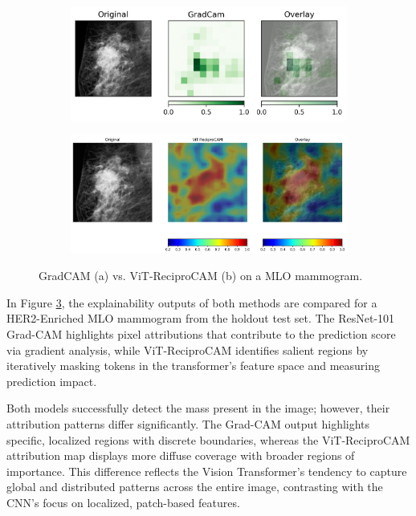 \documentclass[a4paper,10pt]{book}
\begin{document}
\begin{figure}[h!]
    \centering
    \begin{subfigure}[c]{0.48\textwidth}
        \centering
        \includegraphics[width=\textwidth]{reports//assets/D2-0138_MLO-R_Resnet.png}
        \caption{}
        \label{fig:mlo_grad}
    \end{subfigure}
    \begin{subfigure}[c]{0.48\textwidth}
        \centering
        \includegraphics[width=\textwidth]{reports//assets/D2-0138_MLO-R.png}
        \caption{}
        \label{fig:mlo_reci}
    \end{subfigure}
    \caption[GradCAM vs. ViT-ReciproCAM (MLO view)]{GradCAM (a) vs. ViT-ReciproCAM (b) on a MLO mammogram.}
    \label{fig:grad_vs_vit}
\end{figure}



In Figure \ref{fig:grad_vs_vit}, the explainability outputs of both methods are compared for a HER2-Enriched MLO mammogram from the holdout test set. The ResNet-101 Grad-CAM highlights pixel attributions that contribute to the prediction score via gradient analysis, while ViT-ReciproCAM identifies salient regions by iteratively masking tokens in the transformer's feature space and measuring prediction impact.

Both models successfully detect the mass present in the image; however, their attribution patterns differ significantly. The Grad-CAM output highlights specific, localized regions with discrete boundaries, whereas the ViT-ReciproCAM attribution map displays more diffuse coverage with broader regions of importance. This difference reflects the Vision Transformer's tendency to capture global and distributed patterns across the entire image, contrasting with the CNN's focus on localized, patch-based features.
\end{document}
